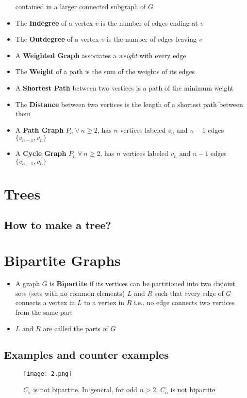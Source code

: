 \begin{itemize}
contained in a larger connected subgraph of $G$
\item The \textbf{Indegree} of a vertex $v$ is the number of
edges ending at $v$
\item The \textbf{Outdegree} of a vertex $v$ is the number of
edges leaving $v$
\item A \textbf{Weighted Graph} associates a \textit{weight} with
every edge
\item The \textbf{Weight} of a path is the sum of the
weights of its edges
\item A \textbf{Shortest Path} between two vertices is a
path of the minimum weight
\item The \textbf{Distance} between two vertices is the
length of a shortest path between them
\item A \textbf{Path Graph} $P_{n} \ \forall \ n \geq 2$, has $n$ vertices labeled $v_{n}$ and $n-1$ edges $\{v_{n-1}, v_{n}\}$
\item A \textbf{Cycle Graph} $P_{n} \ \forall \ n \geq 2$, has $n$ vertices labeled $v_{n}$ and $n-1$ edges $\{v_{n-1}, v_{n}\}$
\end{itemize}
\section{Trees}
\subsection{How to make a tree?}
\section{Bipartite Graphs}
\begin{itemize}
\item A graph $G$ is \textbf{Bipartite} if its vertices can be partitioned into two disjoint sets (sets with no common elements) $L$ and $R$ such that every edge of $G$ connects a vertex in $L$ to a vertex in $R$  i.e., no edge connects two vertices from
the same part
\item $L$ and $R$ are called the parts of $G$
\end{itemize}
\subsection{Examples and counter examples}
\begin{figure}[h]\label{fig_2}
	\centering
	\texttt{[image: 2.png]}
	\caption{$C_{5}$ is not bipartite. In general, for odd $n > 2$, $C_{n}$ is not bipartite}
\end{figure}
